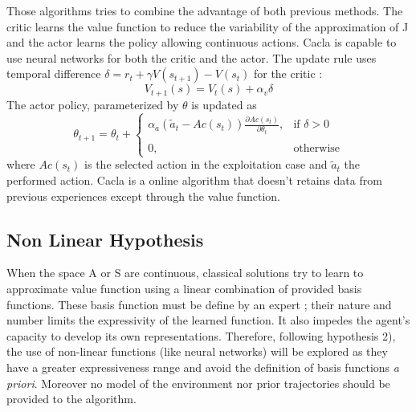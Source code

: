 Those algorithms \cite{Konda2003} tries to combine the advantage of both previous methods.
The critic learns the value function to reduce the variability of the approximation of J 
and the actor learns the policy allowing continuous actions.
Cacla \cite{VanHasselt2007a} is capable to use neural networks for both the critic and the actor.
The update rule uses temporal difference $\delta = r_t + \gamma V(s_{t+1}) - V(s_t)$ for the critic :
\begin{equation}
 V_{t+1}(s) = V_t(s) + \alpha_v \delta
\end{equation}
The actor policy, parameterized by $\theta$ is updated as
\begin{equation}
 \theta_{t+1} = \theta_t + 
 \begin{cases}
 \alpha_a (\widetilde{a}_t - Ac(s_t))
 \frac{\partial Ac(s_t)}{\partial \theta_t} , & \text{if } \delta > 0\\ \\
 0, & \text{otherwise}
 \end{cases}
\end{equation}
where $Ac(s_t)$ is the selected action in the exploitation case and $\widetilde{a}_t$ the performed action.
Cacla is a online algorithm that doesn't retains data from previous experiences except through the
value function. 

\subsection{Non Linear Hypothesis}

When the space A or S are continuous, classical solutions try to learn to approximate value function 
using a linear combination of provided basis functions. 
These basis function must be define by an expert ; their nature and number limits the expressivity 
of the learned function. It also impedes the agent's capacity to develop its own representations.
Therefore, following hypothesis 2), the use of non-linear functions (like neural networks) 
will be explored as they have a greater expressiveness range and avoid the definition of basis functions
{\it a priori}. Moreover no model of the environment nor prior trajectories should be provided to the algorithm.


